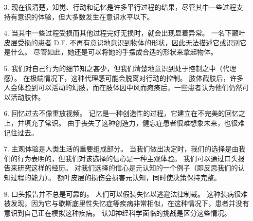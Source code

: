 3. 现在很清楚，知觉、行动和记忆是许多平行过程的结果，尽管其中一些过程支持有意识的体验，但大多数发生在意识水平以下。 

4. 当其中一些过程受损而其他过程完好无损时，就会出现显着异常。 一名下颞叶皮层受损的患者 D.F. 不再有意识地意识到物体的形状，因此无法描述它或识别它是什么。 尽管如此，她还是可以将她的手摆成合适的形状来拿起物体。 

5. 我们对自己行为的细节知之甚少，但我们清楚地意识到处于控制之中（代理感）。 在极端情况下，这种代理感可能会脱离对行动的控制。 肢体截肢后，许多人会体验到可以活动的幻肢，而在肢体因中风而瘫痪后，一些患者认为他们仍然可以活动肢体。 

6. 回忆过去不像重放视频。 记忆是一种创造性的过程，它建立在不完美的回忆之上，并填充了常识。 由于丧失了这种创造力，健忘症患者很难想象未来，也很难记住过去。 

7. 主观体验是人类生活的重要组成部分。 当我们做出决定时，我们的选择是由我们的行为表明的，但我们对该选择的信心是一种主观体验。 我们可以通过口头报告来研究这样的经历。 对我们选择的信心是元认知的一个例子（即反思我们的认知过程的能力）。 额叶皮层的损伤会损害元认知，同时使决策保持完整。 

8. 口头报告并不总是可靠的。 人们可以假装失忆以逃避法律制裁。 这种装病很难被发现，因为它与歇斯底里性失忆症等疾病非常相似，在这种情况下，患者并没有意识到自己正在模拟这种疾病。 认知神经科学面临的挑战是区分这些情况。

